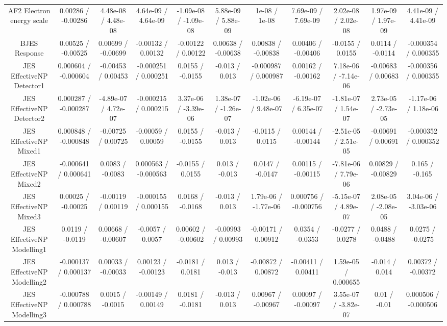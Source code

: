 \begin{table}[htbp]
\begin{center}
\begin{tabular}{|c|c|c|c|c|c|c|c|c|c|c|}
  AF2 Electron energy scale & 0.00286 / -0.00286 & 4.48e-08 / 4.48e-08 & 4.64e-09 / 4.64e-09 & -1.09e-08 / -1.09e-08 & 5.88e-09 / 5.88e-09 & 1e-08 / 1e-08 & 7.69e-09 / 7.69e-09 & 2.02e-08 / 2.02e-08 & 1.97e-09 / 1.97e-09 & 4.41e-09 / 4.41e-09 \\ 
  BJES Response & 0.00525 / -0.00525 & 0.00699 / -0.00699 & -0.00132 / 0.00132 & -0.00122 / 0.00122 & 0.00638 / -0.00638 & 0.00838 / -0.00838 & 0.00406 / -0.00406 & -0.0155 / 0.0155 & 0.0114 / -0.0114 & -0.000354 / 0.000355 \\ 
  JES EffectiveNP Detector1 & 0.000604 / -0.000604 & -0.00453 / 0.00453 & -0.000251 / 0.000251 & 0.0155 / -0.0155 & -0.013 / 0.013 & -0.000987 / 0.000987 & 0.00162 / -0.00162 & 7.18e-06 / -7.14e-06 & -0.00683 / 0.00683 & -0.000356 / 0.000355 \\ 
  JES EffectiveNP Detector2 & 0.000287 / -0.000287 & -4.89e-07 / 4.72e-07 & -0.000215 / 0.000215 & 3.37e-06 / -3.39e-06 & 1.38e-07 / -1.26e-07 & -1.02e-06 / 9.48e-07 & -6.19e-07 / 6.35e-07 & -1.81e-07 / 1.54e-07 & 2.73e-05 / -2.73e-05 & -1.17e-06 / 1.18e-06 \\ 
  JES EffectiveNP Mixed1 & 0.000848 / -0.000848 & -0.00725 / 0.00725 & -0.00059 / 0.00059 & 0.0155 / -0.0155 & -0.013 / 0.013 & -0.0115 / 0.0115 & 0.00144 / -0.00144 & -2.51e-05 / 2.51e-05 & -0.00691 / 0.00691 & -0.000352 / 0.000352 \\ 
  JES EffectiveNP Mixed2 & -0.000641 / 0.000641 & 0.0083 / -0.0083 & 0.000563 / -0.000563 & -0.0155 / 0.0155 & 0.013 / -0.013 & 0.0147 / -0.0147 & 0.00115 / -0.00115 & -7.81e-06 / 7.79e-06 & 0.00829 / -0.00829 & 0.165 / -0.165 \\ 
  JES EffectiveNP Mixed3 & 0.00025 / -0.00025 & -0.00119 / 0.00119 & -0.000155 / 0.000155 & 0.0168 / -0.0168 & -0.013 / 0.013 & 1.79e-06 / -1.77e-06 & 0.000756 / -0.000756 & -5.15e-07 / 4.89e-07 & 2.08e-05 / -2.08e-05 & 3.04e-06 / -3.03e-06 \\ 
  JES EffectiveNP Modelling1 & 0.0119 / -0.0119 & 0.00668 / -0.00607 & -0.0057 / 0.0057 & 0.00602 / -0.00602 & -0.00993 / 0.00993 & -0.00171 / 0.00912 & 0.0354 / -0.0353 & -0.0277 / 0.0278 & 0.0488 / -0.0488 & 0.0275 / -0.0275 \\ 
  JES EffectiveNP Modelling2 & -0.000137 / 0.000137 & 0.00033 / -0.00033 & 0.00123 / -0.00123 & -0.0181 / 0.0181 & 0.013 / -0.013 & -0.00872 / 0.00872 & -0.00411 / 0.00411 & 1.59e-05 / 0.000655 & -0.014 / 0.014 & 0.00372 / -0.00372 \\ 
  JES EffectiveNP Modelling3 & -0.000788 / 0.000788 & 0.0015 / -0.0015 & -0.00149 / 0.00149 & 0.0181 / -0.0181 & -0.013 / 0.013 & 0.00967 / -0.00967 & 0.00097 / -0.00097 & 3.55e-07 / -3.82e-07 & 0.01 / -0.01 & 0.000506 / -0.000506 \\ 

\end{tabular}
\end{center}
\end{table}
